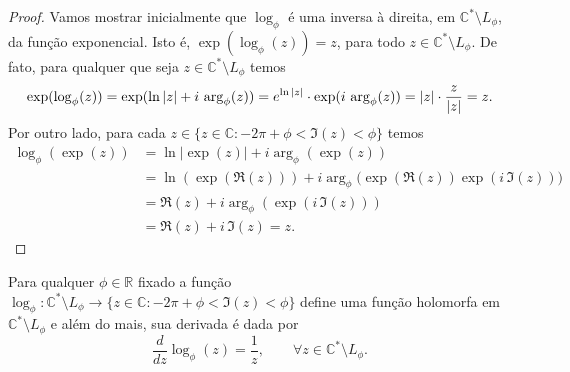 \begin{proof}
Vamos mostrar inicialmente que $\log_{\phi}$ é uma inversa à direita,
em $\mathbb{C}^{*}\setminus L_{\phi}$, da função exponencial. Isto é,
$\exp(\log_{\phi}(z))=z$, para todo $z\in \mathbb{C}^{*}\setminus L_{\phi}$.
De fato, para qualquer que seja $z\in \mathbb{C}^{*}\setminus L_{\phi}$ temos
\[
\exp(\log_{\phi}(z))
=
\exp(\ln|z|+i\,\arg_{\phi}(z))
=
e^{\ln |z|}\cdot \exp(i\,\arg_{\phi}(z))
\\
=
|z|\cdot \frac{z}{|z|} = z.
\]
Por outro lado, para cada $z\in \{z\in\mathbb{C}: -2\pi+\phi<\Im(z)<\phi \}$
temos 
\begin{align*}
\log_{\phi}(\exp(z)) 
&= 
\ln|\exp(z)|+ i\arg_{\phi}(\exp(z))
\\
&=
\ln(\exp(\Re(z)))+ i\arg_{\phi}\Big(\exp(\Re(z))\exp(i\,\Im(z))\Big)
\\
&=
\Re(z)+ i\arg_{\phi}(\exp(i\,\Im(z)))
\\
&=
\Re(z)+ i\,\Im(z) = z.
\end{align*}
\end{proof}



\begin{lema}
Para qualquer $\phi\in\mathbb{R}$ fixado a função 
$\log_{\phi}:\mathbb{C}^{*}\setminus L_{\phi} 
\to \{z\in\mathbb{C}: -2\pi+\phi<\Im(z)<\phi \}$
define uma função holomorfa em $\mathbb{C}^{*}\setminus L_{\phi}$ e além do mais, 
sua derivada é dada por
\[
\frac{d}{dz}\log_{\phi}(z)= \frac{1}{z}, 
\qquad \forall z\in \mathbb{C}^{*}\setminus L_{\phi}.
\]
\end{lema}

